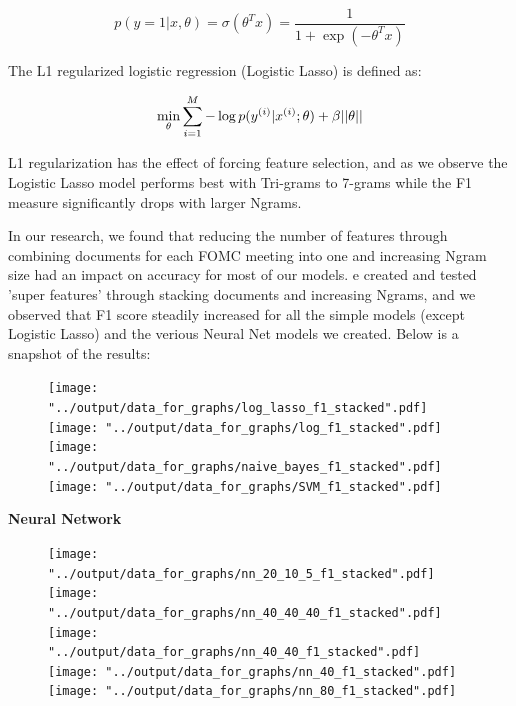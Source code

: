 \documentclass[11pt]{article}
\newcommand{\vertSpace}[1]{\vspace{3mm}}
\begin{document}
$$p(y=1|x,\theta) = \sigma(\theta^T x) = \frac{1}{1+\exp(-\theta^Tx)}$$

The L1 regularized logistic regression (Logistic Lasso) is defined as: 

$$\underset{\rm \theta}{\rm min} \sum_{i=1}^M -\log p(y^{(i)}|x^{(i)}; \theta) + \beta ||\theta||$$

L1 regularization has the effect of forcing feature selection, and as we observe the Logistic Lasso model performs best with Tri-grams to 7-grams while the F1 measure significantly drops with larger Ngrams.  \vertSpace 


\subsubsection{Stacked Documents}

In our research, we found that reducing the number of features through combining documents for each FOMC meeting into one and increasing Ngram size had an impact on accuracy for most of our models.   \vertSpace


We created and tested 'super features' through stacking documents and increasing Ngrams, and we observed that F1 score steadily increased for all the simple models (except Logistic Lasso) and the verious Neural Net models we created.  Below is a snapshot of the results: 


\begin{figure}[H]
\begin{center}
\texttt{[image: "../output/data\_for\_graphs/log\_lasso\_f1\_stacked".pdf]}
\texttt{[image: "../output/data\_for\_graphs/log\_f1\_stacked".pdf]}
\texttt{[image: "../output/data\_for\_graphs/naive\_bayes\_f1\_stacked".pdf]}
\texttt{[image: "../output/data\_for\_graphs/SVM\_f1\_stacked".pdf]}
\end{center}
\end{figure}


\textbf{Neural Network}


\begin{figure}[H]
\begin{center}
\texttt{[image: "../output/data\_for\_graphs/nn\_20\_10\_5\_f1\_stacked".pdf]}
\texttt{[image: "../output/data\_for\_graphs/nn\_40\_40\_40\_f1\_stacked".pdf]}
\texttt{[image: "../output/data\_for\_graphs/nn\_40\_40\_f1\_stacked".pdf]}
\texttt{[image: "../output/data\_for\_graphs/nn\_40\_f1\_stacked".pdf]}
\texttt{[image: "../output/data\_for\_graphs/nn\_80\_f1\_stacked".pdf]}
\end{center}
\end{figure}
\end{document}
